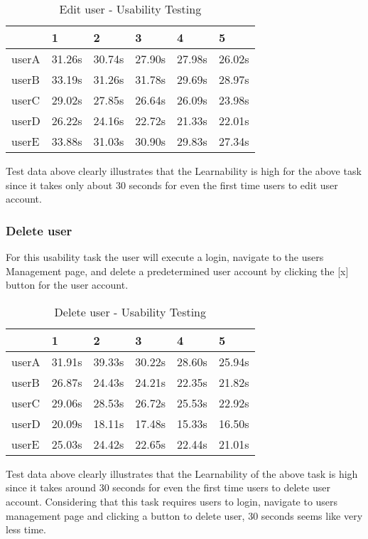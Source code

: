 \documentclass[12pt]{article}
\begin{document}
\begin{table}[H]
\centering
\caption{Edit user - Usability Testing}
\begin{tabular}{|l|l|l|l|l|l|}
\hline
      & 1      & 2      & 3      & 4      & 5      \\ \hline
userA & 31.26s & 30.74s & 27.90s & 27.98s & 26.02s \\ \hline
userB & 33.19s & 31.26s & 31.78s & 29.69s & 28.97s \\ \hline
userC & 29.02s & 27.85s & 26.64s & 26.09s & 23.98s \\ \hline
userD & 26.22s & 24.16s & 22.72s & 21.33s & 22.01s \\ \hline
userE & 33.88s & 31.03s & 30.90s & 29.83s & 27.34s \\ \hline
\end{tabular}
\end{table}

Test data above clearly illustrates that the Learnability is high for the above task since it takes only about 30 seconds for even the first time users to edit user account. 


\subsubsection{Delete user}
For this usability task the user will execute a login, navigate to the users Management page, and delete a predetermined user account by clicking the [x] button for the user account.

\begin{table}[H]
\centering
\caption{Delete user - Usability Testing}
\begin{tabular}{|l|l|l|l|l|l|}
\hline
      & 1      & 2      & 3      & 4      & 5      \\ \hline
userA & 31.91s & 39.33s & 30.22s & 28.60s & 25.94s \\ \hline
userB & 26.87s & 24.43s & 24.21s & 22.35s & 21.82s \\ \hline
userC & 29.06s & 28.53s & 26.72s & 25.53s & 22.92s \\ \hline
userD & 20.09s & 18.11s & 17.48s & 15.33s & 16.50s \\ \hline
userE & 25.03s & 24.42s & 22.65s & 22.44s & 21.01s \\ \hline
\end{tabular}
\end{table}

Test data above clearly illustrates that the Learnability of the above task is high since it takes around 30 seconds for even the first time users to delete user account. Considering that this task requires users to login, navigate to users management page and clicking a button to delete user, 30 seconds seems like very less time.
\end{document}
